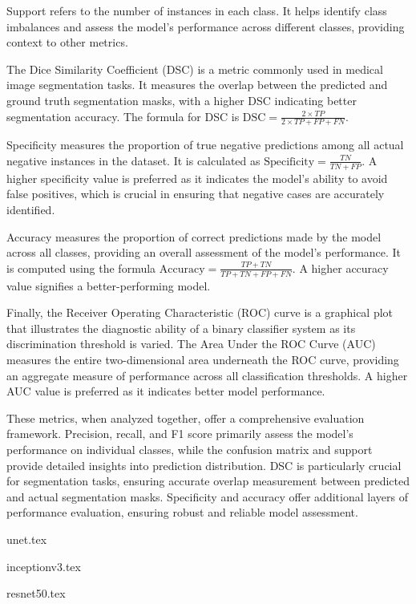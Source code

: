 Support refers to the number of instances in each class. It helps identify class imbalances and assess the model's performance across different classes, providing context to other metrics.

The Dice Similarity Coefficient (DSC) is a metric commonly used in medical image segmentation tasks. It measures the overlap between the predicted and ground truth segmentation masks, with a higher DSC indicating better segmentation accuracy. The formula for DSC is \(\text{DSC} = \frac{2 \times TP}{2 \times TP + FP + FN}\).

Specificity measures the proportion of true negative predictions among all actual negative instances in the dataset. It is calculated as \(\text{Specificity} = \frac{TN}{TN + FP}\). A higher specificity value is preferred as it indicates the model's ability to avoid false positives, which is crucial in ensuring that negative cases are accurately identified.

Accuracy measures the proportion of correct predictions made by the model across all classes, providing an overall assessment of the model's performance. It is computed using the formula \(\text{Accuracy} = \frac{TP + TN}{TP + TN + FP + FN}\). A higher accuracy value signifies a better-performing model.

Finally, the Receiver Operating Characteristic (ROC) curve is a graphical plot that illustrates the diagnostic ability of a binary classifier system as its discrimination threshold is varied. The Area Under the ROC Curve (AUC) measures the entire two-dimensional area underneath the ROC curve, providing an aggregate measure of performance across all classification thresholds. A higher AUC value is preferred as it indicates better model performance.

These metrics, when analyzed together, offer a comprehensive evaluation framework. Precision, recall, and F1 score primarily assess the model's performance on individual classes, while the confusion matrix and support provide detailed insights into prediction distribution. DSC is particularly crucial for segmentation tasks, ensuring accurate overlap measurement between predicted and actual segmentation masks. Specificity and accuracy offer additional layers of performance evaluation, ensuring robust and reliable model assessment.




{unet.tex}

{inceptionv3.tex}

{resnet50.tex}
